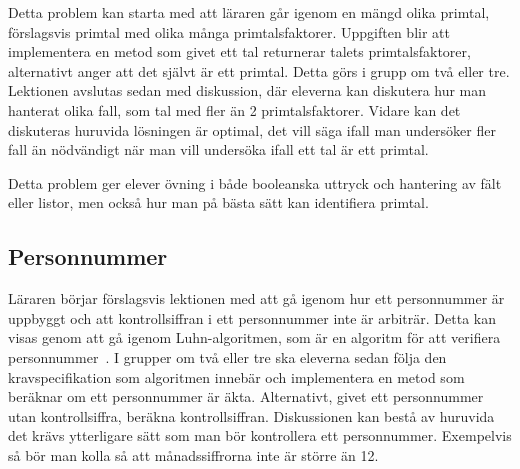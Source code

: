    \textcolor{WildStrawberry}{
        Detta problem kan starta med att läraren går igenom en mängd olika primtal, förslagsvis primtal med olika många primtalsfaktorer. Uppgiften blir att implementera en metod som givet ett tal returnerar talets primtalsfaktorer, alternativt anger att det självt är ett primtal. Detta görs i grupp om två eller tre. Lektionen avslutas sedan med diskussion, där eleverna kan diskutera hur man hanterat olika fall, som tal med fler än 2 primtalsfaktorer. Vidare kan det diskuteras huruvida lösningen är optimal, det vill säga ifall man undersöker fler fall än nödvändigt när man vill undersöka ifall ett tal är ett primtal.
        }
        
    \textcolor{WildStrawberry}{
        Detta problem ger elever övning i både booleanska uttryck och hantering av fält eller listor, men också hur man på bästa sätt kan identifiera primtal.
        }

\subsection{Personnummer}
    \label{sec:Personnummer}
    
    \textcolor{WildStrawberry}{
        Läraren börjar förslagsvis lektionen med att gå igenom hur ett personnummer är uppbyggt och att kontrollsiffran i ett personnummer inte är arbiträr. Detta kan visas genom att gå igenom Luhn-algoritmen, som är en algoritm för att verifiera personnummer~\cite{Luhn}. I grupper om två eller tre ska eleverna sedan följa den kravspecifikation som algoritmen innebär och implementera en metod som beräknar om ett personnummer är äkta. Alternativt, givet ett personnummer utan kontrollsiffra, beräkna kontrollsiffran. Diskussionen kan bestå av huruvida det krävs ytterligare sätt som man bör kontrollera ett personnummer. Exempelvis så bör man kolla så att månadssiffrorna inte är större än 12.}
        
